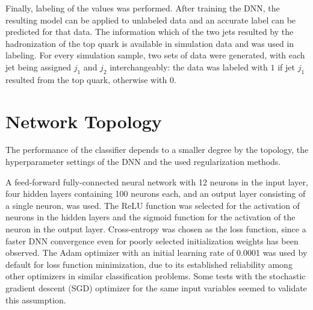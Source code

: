 Finally, labeling of the values was performed. After training the DNN, the resulting model can be applied to unlabeled data and an accurate label can be predicted for that data. The information which of the two jets resulted by the hadronization of the top quark is available in simulation data and was used in labeling. For every simulation sample, two sets of data were generated, with each jet being assigned $j_1$ and $j_2$ interchangeably: the data was labeled with $1$ if jet $j_1$ resulted from the top quark, otherwise with $0$.

\section{Network Topology}
\label{sec:ch-5-network}

The performance of the classifier depends to a smaller degree by the topology, the hyperparameter settings of the DNN and the used regularization methods.

A feed-forward fully-connected neural network with 12 neurons in the input layer, four hidden layers containing 100 neurons each, and an output layer consisting of a single neuron, was used. The ReLU function was selected for the activation of neurons in the hidden layers and the sigmoid function for the activation of the neuron in the output layer. Cross-entropy was chosen as the loss function, since a faster DNN convergence even for poorly selected initialization weights has been observed. The Adam optimizer with an initial learning rate of 0.0001 was used by default for loss function minimization, due to its established reliability among other optimizers in similar classification problems. Some tests with the stochastic gradient descent (SGD) optimizer for the same input variables seemed to validate this assumption.

